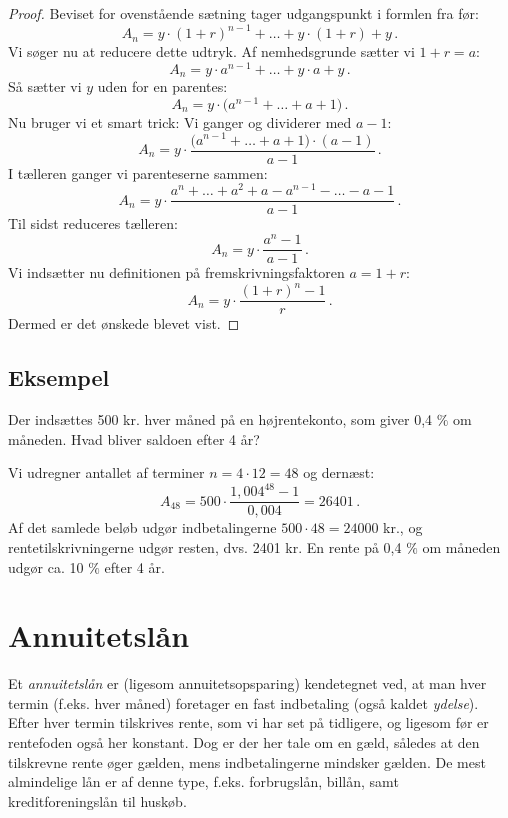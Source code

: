 \documentclass[12pt,oneside,a4paper]{article}
\begin{document}
\begin{tcolorbox}
\begin{proof}
Beviset for ovenstående sætning tager udgangspunkt i formlen fra før:
\[
A_n = y\cdot(1+r)^{n-1} + \ldots + y\cdot(1+r) + y \,.
\]
Vi søger nu at reducere dette udtryk.  Af nemhedsgrunde sætter vi $1+r = a$:
\[
A_n = y\cdot a^{n-1} + \ldots + y\cdot a + y \,.
\]
Så sætter vi $y$ uden for en parentes:
\[
A_n = y\cdot\big(a^{n-1} + \ldots + a + 1\big) \,.
\]
Nu bruger vi et smart trick: Vi ganger og dividerer med $a-1$:
\[
A_n = y\cdot\frac{\big(a^{n-1} + \ldots + a + 1\big)\cdot(a-1)}{a-1} \,.
\]
I tælleren ganger vi parenteserne sammen:
\[
A_n = y\cdot\frac{a^{n} + \ldots + a^2 + a - a^{n-1} - \ldots - a - 1}{a-1} \,.
\]
Til sidst reduceres tælleren:
\[
A_n = y\cdot\frac{a^{n} - 1}{a-1} \,.
\]
Vi indsætter nu definitionen på fremskrivningsfaktoren $a=1+r$:
\[
A_n = y\cdot\frac{(1+r)^{n} - 1}{r} \,.
\]
Dermed er det ønskede blevet vist.
\end{proof}
\end{tcolorbox}

\begin{tcolorbox}
\subsection*{Eksempel}
Der indsættes 500 kr. hver måned på en højrentekonto, som giver
0,4 $\%$ om måneden. Hvad bliver saldoen efter 4 år?

Vi udregner antallet af terminer $n=4\cdot12 = 48$ og dernæst:
\[
A_{48} = 500\cdot\frac{1,004^{48}-1}{0,004} = 26401 \,.
\]
Af det samlede beløb udgør indbetalingerne $500\cdot 48 = 24000$ kr., og
rentetilskrivningerne udgør resten, dvs. 2401 kr. En rente på 0,4 $\%$
om måneden udgør ca. 10 $\%$ efter 4 år.

\end{tcolorbox}

\section{Annuitetslån}
Et \emph{annuitetslån} er (ligesom annuitetsopsparing) kendetegnet ved, at man
hver termin (f.eks. hver måned) foretager en fast indbetaling (også kaldet
\emph{ydelse}). Efter hver termin tilskrives rente, som vi har set på
tidligere, og ligesom før er rentefoden også her konstant. Dog er der her tale
om en gæld, således at den tilskrevne rente øger gælden, mens indbetalingerne
mindsker gælden.  De mest almindelige lån er af denne type, f.eks. forbrugslån,
billån, samt kreditforeningslån til huskøb.
\end{document}
